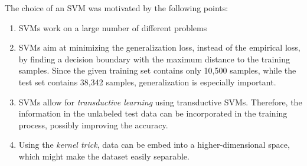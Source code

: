 The choice of an SVM was motivated by the following points:

\begin{enumerate}
\item SVMs work on a large number of different problems
\item SVMs aim at minimizing the generalization loss, instead of the empirical loss, by finding a decision boundary with the maximum distance to the training samples. Since the given training set contains only 10,500 samples, while the test set contains 38,342 samples, generalization is especially important.
\item SVMs allow for \emph{transductive learning} using transductive SVMs. Therefore, the information in the unlabeled test data can be incorporated in the training process, possibly improving the accuracy.
\item Using the \emph{kernel trick}, data can be embed into a higher-dimensional space, which might make the dataset easily separable.
\end{enumerate}